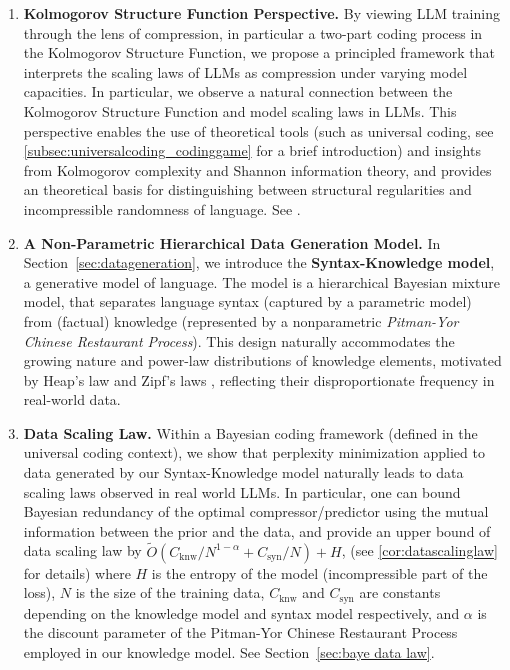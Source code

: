 \documentclass[11pt]{article}
\theoremstyle{plain}
\theoremstyle{definition}
\begin{document}
\begin{enumerate}
    \item \textbf{Kolmogorov Structure Function Perspective.}
   By viewing LLM training through the lens of compression, in particular a two-part coding process in the Kolmogorov Structure Function, we propose a principled framework that interprets the scaling laws of LLMs as compression under varying model capacities. In particular, we observe a natural connection between the Kolmogorov Structure Function and model scaling laws in LLMs. This perspective enables the use of theoretical tools (such as universal coding, see \cref{subsec:universalcoding_codinggame} for a brief introduction) and insights from Kolmogorov complexity and Shannon information theory, and provides an theoretical basis for distinguishing between structural regularities and incompressible randomness of language. See .

    \item \textbf{A Non-Parametric Hierarchical Data Generation Model.}
    In Section~\ref{sec:datageneration}, we introduce the \textbf{Syntax-Knowledge model}, a generative model of language. The model 
    is a hierarchical Bayesian mixture model, that separates language syntax (captured by a parametric model) from (factual) knowledge (represented by a nonparametric \emph{Pitman-Yor Chinese Restaurant Process}). This design naturally accommodates the growing nature and  power-law distributions of knowledge elements, motivated by Heap’s law \citep{heaps1978information} and Zipf’s laws 
    \citep{zipf2016human}, reflecting their disproportionate frequency in real-world data.

    \item \textbf{Data Scaling Law.}
    Within a Bayesian coding framework (defined in the universal coding context), we show that perplexity minimization applied to data generated by our Syntax-Knowledge model naturally leads to data scaling laws observed in real world LLMs. In particular, one can bound Bayesian redundancy of the optimal compressor/predictor 
    using the mutual information between the prior and
    the data, and provide an upper bound of data scaling law
    by    
    $\widetilde{O}\left(C_{\text{knw}}/N^{1-\alpha}+ C_{\text{syn}}/N\right)+H$, 
    (see \cref{cor:datascalinglaw} for details)
    where $H$ is the entropy of the model (incompressible part of the loss), $N$ is the size of the training data, $C_{\text{knw}}$ and $C_{\text{syn}}$
    are constants depending on the knowledge model and syntax model respectively, and $\alpha$ is the discount parameter of the Pitman-Yor Chinese Restaurant Process employed in our knowledge model.
    See Section~\ref{sec:baye data law}. 
    

\end{enumerate}
\end{document}
